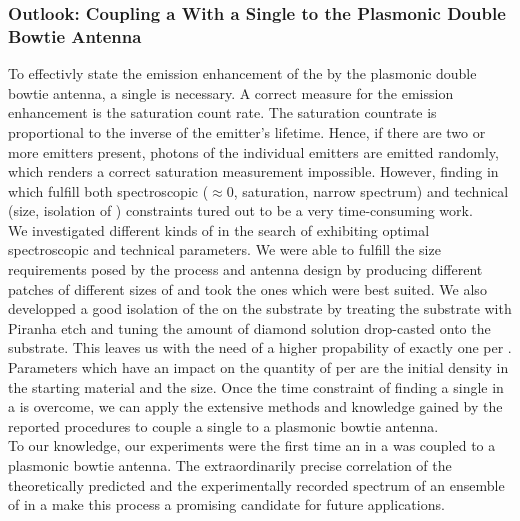 		\subsubsection{Outlook: Coupling a \Nd With a Single \Siv to the Plasmonic Double Bowtie Antenna}
			To effectivly state the emission enhancement of the \siv by the plasmonic double bowtie antenna, a single \siv is necessary.
			A correct measure for the emission enhancement is the saturation count rate.
			The saturation countrate is proportional to the inverse of the emitter's lifetime.
			Hence, if there are two or more emitters present, photons of the individual emitters are emitted randomly, which renders a correct saturation measurement impossible. 
			However, finding \sivs in \nds which fulfill both spectroscopic (\gtz $\approx$0, saturation, narrow \ZPL spectrum) and technical (size, isolation of \nds) constraints tured out to be a very time-consuming work.
			\\
			We investigated different kinds of \nds in the search of \nds exhibiting optimal spectroscopic and technical parameters.
			We were able to fulfill the size requirements posed by the \pp process and antenna design by producing different patches of different sizes of \nds and took the ones which were best suited.
			We also developped a good isolation of the \nds on the substrate by treating the \ir substrate with Piranha etch and tuning the amount of diamond solution drop-casted onto the substrate.
			This leaves us with the need of a higher propability of exactly one \siv per \nd.
			Parameters which have an impact on the quantity of \sivs per \nd are the initial \siv density in the starting material and the \nd size.
			Once the time constraint of finding a single \siv in a \nd is overcome, we can apply the extensive methods and knowledge gained by the reported procedures to couple a single \siv to a plasmonic bowtie antenna.
			\\
			To our knowledge, our experiments were the first time an \siv in a \nd was coupled to a plasmonic bowtie antenna.
			The extraordinarily precise correlation of the theoretically predicted and the experimentally recorded spectrum of an ensemble of \sivs in a \nd make this process a promising candidate for future applications.

